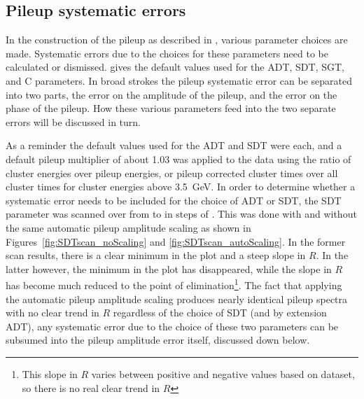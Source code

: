 \subsection{Pileup systematic errors}
\label{sub:pileuperror}

In the construction of the pileup as described in , various parameter choices are made. Systematic errors due to the choices for these parameters need to be calculated or dismissed.  gives the default values used for the ADT, SDT, SGT, and C parameters. In broad strokes the pileup systematic error can be separated into two parts, the error on the amplitude of the pileup, and the error on the phase of the pileup. How these various parameters feed into the two separate errors will be discussed in turn.

As a reminder the default values used for the ADT and SDT were  each, and a default pileup multiplier of about 1.03 was applied to the data using the ratio of cluster energies over pileup energies, or pileup corrected cluster times over all cluster times for cluster energies above \SI{3.5}{\GeV}. In order to determine whether a systematic error needs to be included for the choice of ADT or SDT, the SDT parameter was scanned over from  to  in steps of . This was done with and without the same automatic pileup amplitude scaling as shown in Figures~\ref{fig:SDTscan_noScaling} and \ref{fig:SDTscan_autoScaling}. In the former scan results, there is a clear minimum in the \chisq plot and a steep slope in $R$. In the latter however, the minimum in the \chisq plot has disappeared, while the slope in $R$ has become much reduced to the point of elimination\footnote{This slope in $R$ varies between positive and negative values based on dataset, so there is no real clear trend in $R$}. The fact that applying the automatic pileup amplitude scaling produces nearly identical pileup spectra with no clear trend in $R$ regardless of the choice of SDT (and by extension ADT), any systematic error due to the choice of these two parameters can be subsumed into the pileup amplitude error itself, discussed down below.



